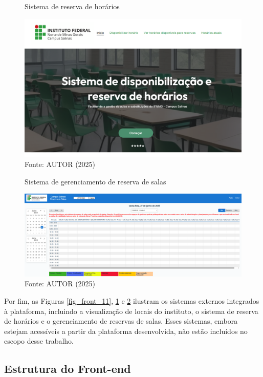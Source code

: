 \begin{figure}[H]
    \centering
    \caption{Sistema de reserva de horários}
    \includegraphics[width=1\textwidth]{Figuras/front-12.png}
    \caption*{Fonte: AUTOR (2025)}
    \label{fig_front_12}
\end{figure}

\begin{figure}[htb]
    \centering
    \caption{Sistema de gerenciamento de reserva de salas}
    \includegraphics[width=1\textwidth]{Figuras/front-13.png}
    \caption*{Fonte: AUTOR (2025)}
    \label{fig_front_13}
\end{figure}

Por fim, as Figuras \ref{fig_front_11}, \ref{fig_front_12} e \ref{fig_front_13} ilustram os sistemas externos integrados à plataforma, incluindo a visualização de locais do instituto, o sistema de reserva de horários e o gerenciamento de reservas de salas. Esses sistemas, embora estejam acessíveis a partir da plataforma desenvolvida, não estão incluídos no escopo desse trabalho.

\subsection{Estrutura do Front-end}

